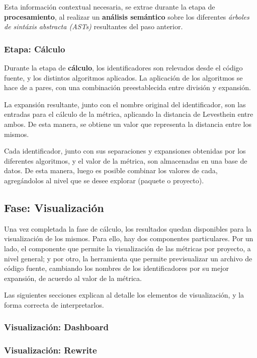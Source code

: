 Esta información contextual necesaria, se extrae durante la etapa de \textbf{procesamiento},
al realizar un \textbf{análisis semántico} sobre los diferentes \textit{árboles de sintáxis abstracta (ASTs)} 
resultantes del paso anterior.

\subsubsection{Etapa: Cálculo}

Durante la etapa de \textbf{cálculo}, los identificadores son relevados desde el código fuente,
y los distintos algoritmos aplicados.
La aplicación de los algoritmos se hace de a pares, con una combinación preestablecida
entre división y expansión.

La expansión resultante, junto con el nombre original del identificador, son las
entradas para el cálculo de la métrica, aplicando la distancia de Levesthein
entre ambos.
De esta manera, se obtiene un valor que representa la distancia entre los mismos.

Cada identificador, junto con sus separaciones y expansiones obtenidas por los diferentes
algoritmos, y el valor de la métrica, son almacenadas en una base de datos.
De esta manera, luego es posible combinar los valores de cada, agregándolos al nivel
que se desee explorar (paquete o proyecto).

\subsection{Fase: Visualización}

Una vez completada la fase de cálculo, los resultados quedan disponibles para la
visualización de los mismos.
Para ello, hay dos componentes particulares.
Por un lado, el componente que permite la visualización de las métricas por proyecto,
a nivel general; y por otro, la herramienta que permite previsualizar un archivo
de código fuente, cambiando los nombres de los identificadores por su mejor expansión,
de acuerdo al valor de la métrica.

Las siguientes secciones explican al detalle los elementos de visualización, y
la forma correcta de interpretarlos.

\subsubsection{Visualización: Dashboard}



\subsubsection{Visualización: Rewrite}

